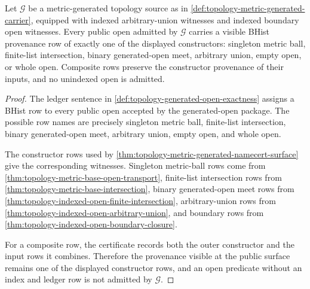 \begin{theorem}
\label{thm:topology-metric-generated-ledger-scope}
Let $\mathcal{G}$ be a metric-generated topology source as in \autoref{def:topology-metric-generated-carrier}, equipped with indexed arbitrary-union witnesses and indexed boundary open witnesses. Every public open admitted by $\mathcal{G}$ carries a visible BHist provenance row of exactly one of the displayed constructors: singleton metric ball, finite-list intersection, binary generated-open meet, arbitrary union, empty open, or whole open. Composite rows preserve the constructor provenance of their inputs, and no unindexed open is admitted.
\end{theorem}
\begin{proof}
The ledger sentence in \autoref{def:topology-generated-open-exactness} assigns a BHist row to every public open accepted by the generated-open package. The possible row names are precisely singleton metric ball, finite-list intersection, binary generated-open meet, arbitrary union, empty open, and whole open.

The constructor rows used by \autoref{thm:topology-metric-generated-namecert-surface} give the corresponding witnesses. Singleton metric-ball rows come from \autoref{thm:topology-metric-base-open-transport}, finite-list intersection rows from \autoref{thm:topology-metric-base-intersection}, binary generated-open meet rows from \autoref{thm:topology-indexed-open-finite-intersection}, arbitrary-union rows from \autoref{thm:topology-indexed-open-arbitrary-union}, and boundary rows from \autoref{thm:topology-indexed-open-boundary-closure}.

For a composite row, the certificate records both the outer constructor and the input rows it combines. Therefore the provenance visible at the public surface remains one of the displayed constructor rows, and an open predicate without an index and ledger row is not admitted by $\mathcal{G}$.
\end{proof}


